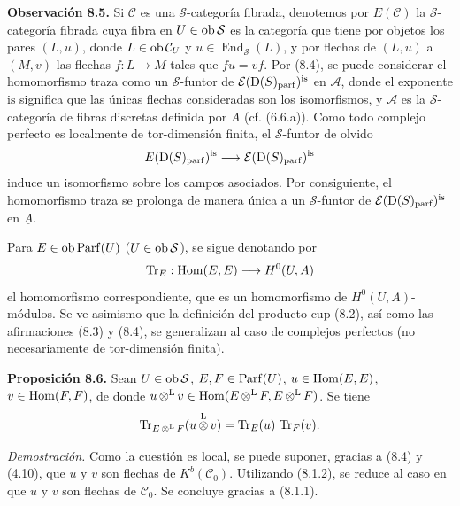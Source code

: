 
\providecommand{\sisi}[2]{#2}

\textbf{Observación 8.5.} Si \(\mathcal C\) es una \(\sisi{S}{\mathcal S}\)-categoría fibrada, denotemos por \(E(\mathcal C)\) la \(\sisi{S}{\mathcal S}\)-categoría fibrada cuya fibra en \(U\in\Ob \sisi{S}{\mathcal S}\) es la categoría que tiene por objetos los pares \((L,u)\), donde \(L\in\operatorname{ob}\mathcal C_U\) y \(u\in\sisi{\operatorname{End}_S(L)}{\operatorname{End}_{\mathcal S}(L)}\), y por flechas de \((L,u)\) a \((M,v)\) las flechas \(f:L\to M\) tales que \(fu=vf\). Por (8.4), se puede considerar el homomorfismo traza como un \(\sisi{S}{\mathcal S}\)-funtor de \(\mathcal E(\mathrm D(S)_{\operatorname{parf}})^{\mathrm{is}}\) en \(\mathcal A\), donde el exponente \(\mathrm{is}\) significa que las únicas flechas consideradas son los isomorfismos, y \(\mathcal A\) es la \(\sisi{S}{\mathcal S}\)-categoría de fibras discretas definida por \(A\) (cf. (6.6.a)). Como todo complejo perfecto es localmente de tor-dimensión finita, el \(\sisi{S}{\mathcal S}\)-funtor de olvido
\[
  E(\mathrm D(S)_{\operatorname{parf}})^{\mathrm{is}}
  \longrightarrow
  \mathcal E(\mathrm D(S)_{\operatorname{parf}})^{\mathrm{is}}
\]
induce un isomorfismo sobre los campos asociados. Por consiguiente, el homomorfismo traza se prolonga de manera única a un \(\sisi{S}{\mathcal S}\)-funtor de \(\mathcal E(\mathrm D(S)_{\operatorname{parf}})^{\mathrm{is}}\) en \(\underline A\).

Para \(E\in\operatorname{ob}\operatorname{Parf}(U)\) (\(U\in\Ob \sisi{S}{\mathcal S}\)), se sigue denotando por
\[
  \operatorname{Tr}_E:\operatorname{Hom}(E,E)\longrightarrow H^0(U,A)
\]
el homomorfismo correspondiente, que es un homomorfismo de \(H^0(U,A)\)-módulos. Se ve asimismo que la definición del producto cup (8.2), así como las afirmaciones (8.3) y (8.4), se generalizan al caso de complejos perfectos (no necesariamente de tor-dimensión finita).

\textbf{Proposición 8.6.} Sean \(U\in\Ob \sisi{S}{\mathcal S}\), \(E,F\in\operatorname{Parf}(U)\), \(u\in\operatorname{Hom}(E,E)\), \(v\in\operatorname{Hom}(F,F)\), de donde \(u\mathop{\otimes}^{\mathrm L} v\in\operatorname{Hom}(E\mathop{\otimes}^{\mathrm L} F,E\mathop{\otimes}^{\mathrm L} F)\). Se tiene
\[
  \operatorname{Tr}_{E\mathop{\otimes}^{\mathrm L} F}(u\mathop{\otimes}^{\mathrm L} v)=\operatorname{Tr}_E(u)\,\operatorname{Tr}_F(v).
\]

\emph{Demostración.} Como la cuestión es local, se puede suponer, gracias a (8.4) y (4.10), que \(u\) y \(v\) son flechas de \(K^b(\mathcal C_0)\). Utilizando (8.1.2), se reduce al caso en que \(u\) y \(v\) son flechas de \(\mathcal C_0\). Se concluye gracias a (8.1.1).

